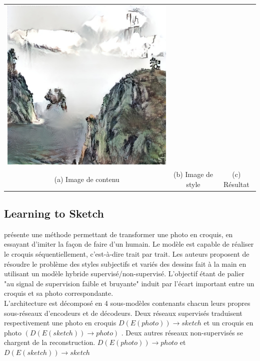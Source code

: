 \documentclass[a4paper, 12pt]{report}
\begin{document}
\begin{center}
\begin{tabular}{ccc}
    \includegraphics[height=0.15\textheight]{images/gaugan-tds.jpg}\\
    (a) Image de contenu & (b) Image de style &(c) Résultat
  \end{tabular}
\end{center}


\subsection{Learning to Sketch} 
\cite{DBLP:journals/corr/abs-1805-00247} présente une méthode permettant de transformer une photo en croquis, en essayant d'imiter la façon de faire d'un humain. Le modèle est capable de réaliser le croquis séquentiellement, c'est-à-dire trait par trait. Les auteurs proposent de résoudre le problème des styles subjectifs et variés des dessins fait à la main en utilisant un modèle hybride supervisé/non-supervisé. L'objectif étant de palier "au signal de supervision faible et bruyante" induit par l'écart important entre un croquis et sa photo correspondante. \\

L'architecture est décomposé en 4 sous-modèles contenants chacun leurs propres sous-réseaux d'encodeurs et de décodeurs. Deux réseaux supervisés traduisent respectivement une photo en croquis $D(E(photo))\to sketch$ et un croquis en photo $(D(E(sketch))\to photo)$ . Deux autres réseaux non-supervisés se chargent de la reconstruction. $D(E(photo))\to photo$ et $D(E(sketch))\to sketch$  \\
\end{document}
